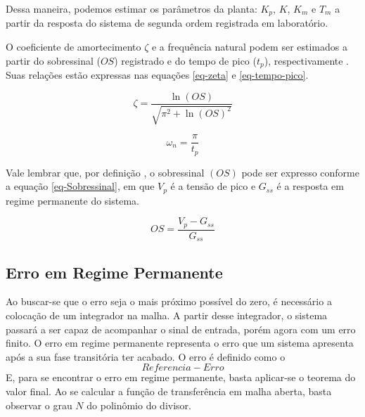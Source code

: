 Dessa maneira, podemos estimar os parâmetros da planta: $K_p$, $K$, $K_m$ e $T_m$ a partir da resposta do sistema de segunda ordem registrada em laboratório.

O coeficiente de amortecimento $\zeta$ e a frequência natural podem ser estimados a partir do sobressinal ($OS$) registrado e do tempo de pico ($t_p$), respectivamente \cite{ogata2003engenharia}. Suas relações estão expressas nas equações \ref{eq-zeta} e \ref{eq-tempo-pico}.

\begin{equation}
\zeta = \frac{\ln(OS)}{\sqrt{\pi^2 + \ln(OS)^2}}
\label{eq-zeta}
\end{equation}

\begin{equation}
\omega_n = \frac{\pi}{t_p}
\label{eq-tempo-pico}
\end{equation}

Vale lembrar que, por definição \cite{Nise:ControlSistemsEngineering}, o sobressinal $(OS)$ pode ser expresso conforme a equação \ref{eq-Sobressinal}, em que $V_p$ é a tensão de pico e $G_{ss}$ é a resposta em regime permanente do sistema.

\begin{equation}
OS = \frac{V_p - G_{ss}}{G_{ss}}
\label{eq-Sobressinal}
\end{equation}

\subsection{Erro em Regime Permanente}
Ao buscar-se que o erro seja o mais próximo possível do zero, é necessário a colocação de um integrador na malha. A partir desse integrador, o sistema passará a ser capaz de acompanhar o sinal de entrada, porém agora com um erro finito. O erro em regime permanente representa o erro que um sistema apresenta após a sua fase transitória ter acabado.
O erro é definido como o 
\begin{equation}
    Referencia - Erro
\end{equation}
E, para se encontrar o erro em regime permanente, basta aplicar-se o teorema do valor final. Ao se calcular a função de transferência em malha aberta, basta observar o grau $N$ do polinômio do divisor.


